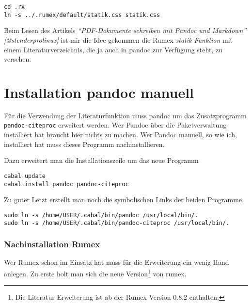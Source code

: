 \begin{verbatim}
cd .rx
ln -s ../.rumex/default/statik.css statik.css
\end{verbatim}


Beim Lesen des Artikels \emph{``PDF-Dokumente schreiben mit Pandoc und
Markdown'' {[}@stenderprolinux{]}} ist mir die Idee gekommen die Rumex
\emph{statik Funktion} mit einem Literaturverzeichnis, die ja auch in
pandoc zur Verfügung steht, zu versehen.

\section{Installation pandoc manuell}\label{installation-pandoc-manuell}

Für die Verwendung der Literaturfunktion muss pandoc um das
Zusatzprogramm \texttt{pandoc-citeproc} erweitert werden. Wer Pandoc
über die Paketverwaltung installiert hat braucht hier nichts zu machen.
Wer Pandoc manuell, so wie ich, installiert hat muss dieses Programm
nachinstallieren.

Dazu erweitert man die Installationszeile um das neue Programm

\begin{verbatim}
cabal update
cabal install pandoc pandoc-citeproc
\end{verbatim}

Zu guter Letzt erstellt man noch die symbolischen Links der beiden
Programme.

\begin{verbatim}
sudo ln -s /home/USER/.cabal/bin/pandoc /usr/local/bin/.
sudo ln -s /home/USER/.cabal/bin/pandoc-citeproc /usr/local/bin/.
\end{verbatim}

\subsubsection{Nachinstallation Rumex}\label{nachinstallation-rumex}

Wer Rumex schon im Einsatz hat muss für die Erweiterung ein wenig Hand
anlegen. Zu erste holt man sich die neue Version\footnote{Die Literatur
  Erweiterung ist ab der Rumex Version 0.8.2 enthalten.} von rumex.

